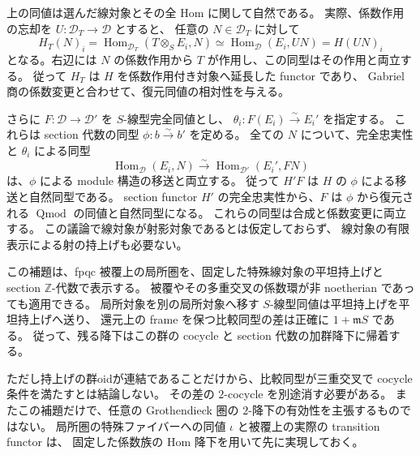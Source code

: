\begin{remark}
\label{rem:abel-flat-cover-reconstruction-natural}
上の同値は選んだ線対象とその全 Hom に関して自然である。
実際、係数作用の忘却を $U:\mathcal D_T\to\mathcal D$ とすると、
任意の $N\in\mathcal D_T$ に対して
\[
 H_T(N)_i
 =\operatorname{Hom}_{\mathcal D_T}(T\otimes_SE_i,N)
 \simeq\operatorname{Hom}_{\mathcal D}(E_i,UN)=H(UN)_i
\]
となる。右辺には $N$ の係数作用から $T$ が作用し、この同型はその作用と両立する。
従って $H_T$ は $H$ を係数作用付き対象へ延長した functor であり、
Gabriel 商の係数変更と合わせて、復元同値の相対性を与える。

さらに $F:\mathcal D\to\mathcal D'$ を $S$-線型完全同値とし、
$\theta_i:F(E_i)\xrightarrow{\sim}E_i'$ を指定する。
これらは section 代数の同型 $\phi:b\xrightarrow{\sim}b'$ を定める。
全ての $N$ について、完全忠実性と $\theta_i$ による同型
\[
 \operatorname{Hom}_{\mathcal D}(E_i,N)
 \xrightarrow{\sim}\operatorname{Hom}_{\mathcal D'}(E_i',FN)
\]
は、$\phi$ による module 構造の移送と両立する。
従って $H'F$ は $H$ の $\phi$ による移送と自然同型である。
section functor $H'$ の完全忠実性から、$F$ は
$\phi$ から復元される $\operatorname{Qmod}$ の同値と自然同型になる。
これらの同型は合成と係数変更に両立する。
この議論で線対象が射影対象であるとは仮定しておらず、
線対象の有限表示による射の持上げも必要ない。
\end{remark}

\begin{remark}[実際の降下に供給する内容と残る段階]
この補題は、fpqc 被覆上の局所圏を、固定した特殊線対象の平坦持上げと
section $\mathbb Z$-代数で表示する。
被覆やその多重交叉の係数環が非 noetherian であっても適用できる。
局所対象を別の局所対象へ移す $S$-線型同値は平坦持上げを平坦持上げへ送り、
還元上の frame を保つ比較同型の差は正確に $1+\mathfrak mS$ である。
従って、残る降下はこの群の cocycle と section 代数の加群降下に帰着する。

ただし持上げの群oidが連結であることだけから、比較同型が三重交叉で
cocycle 条件を満たすとは結論しない。
その差の $2$-cocycle を別途消す必要がある。
またこの補題だけで、任意の Grothendieck 圏の $2$-降下の有効性を主張するものではない。
局所圏の特殊ファイバーへの同値 $\iota$ と被覆上の実際の transition functor は、
固定した係数族の Hom 降下を用いて先に実現しておく。
\end{remark}

